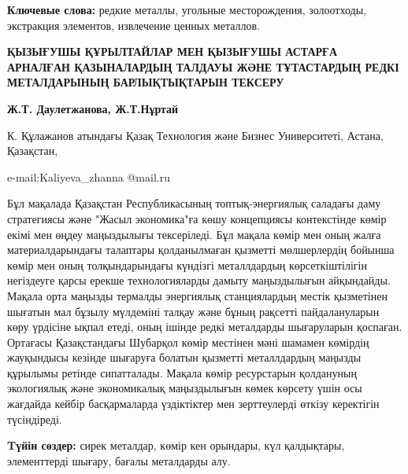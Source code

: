 {\bfseries Ключевые слова:} редкие металлы, угольные месторождения,
золоотходы, экстракция элементов, извлечение ценных металлов.

\begin{center}
{\large\bfseries ҚЫЗЫҒУШЫ ҚҰРЫЛТАЙЛАР МЕН ҚЫЗЫҒУШЫ АСТАРҒА АРНАЛҒАН ҚАЗЫНАЛАРДЫҢ
ТАЛДАУЫ ЖӘНЕ ТҰТАСТАРДЫҢ РЕДКІ МЕТАЛДАРЫНЫҢ БАРЛЫҚТЫҚТАРЫН ТЕКСЕРУ}

{\bfseries Ж.Т. Даулетжанова, Ж.Т.Нұртай}

К. Құлажанов атындағы Қазақ Технология және Бизнес Университеті, Астана,
Қазақстан,

e-mail:Kaliyeva\_zhanna @mail.ru
\end{center}

Бұл мақалада Қазақстан Республикасының топтық-энергиялық саладағы даму
стратегиясы және "Жасыл экономика"ға көшу концепциясы контекстінде көмір
екімі мен өңдеу маңыздылығы тексеріледі. Бұл мақала көмір мен оның жалға
материалдарындағы талаптары қолданылмаған қызметті мөлшерлердің бойынша
көмір мен оның толқындарындағы күндізгі металлдардың көрсеткіштілігін
негіздеуге қарсы ерекше технологияларды дамыту маңыздылығын айқындайды.
Мақала орта маңызды термалды энергиялық станциялардың местік қызметінен
шығатын мал бұзылу мүлдеміні талқау және бұның рақсетті пайдалануларын
көру үрдісіне ықпал етеді, оның ішінде редкі металдарды шығаруларын
қоспаған. Ортағасы Қазақстандағы Шубарқол көмір местінен мәні шамамен
көмірдің жауқындысы кезінде шығаруға болатын қызметті металлдардың
маңызды құрылымы ретінде сипатталады. Мақала көмір ресурстарын
қолдануның экологиялық және экономикалық маңыздылығын көмек көрсету үшін
осы жағдайда кейбір басқармаларда үздіктіктер мен зерттеулерді өткізу
керектігін түсіндіреді.

{\bfseries Tүйін сөздер:} сирек металдар, көмір кен орындары, күл
қалдықтары, элементтерді шығару, бағалы металдарды алу.

